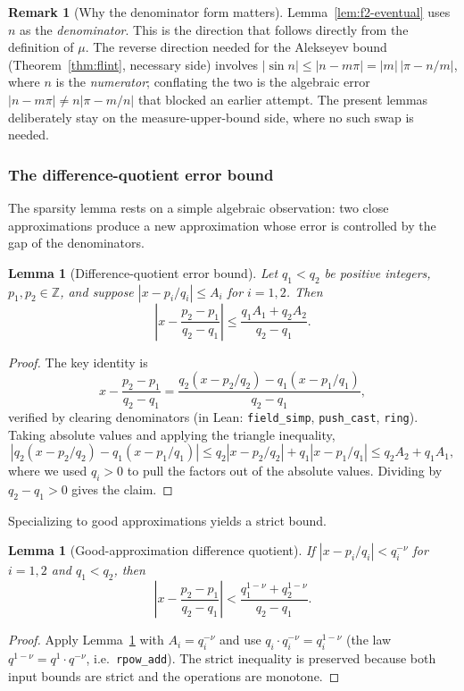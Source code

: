 \documentclass[11pt]{amsart}
\newtheorem{lemma}[theorem]{Lemma}
\theoremstyle{definition}
\newtheorem{remark}[theorem]{Remark}
\theoremstyle{remark}
\numberwithin{equation}{section}
\newcommand{\Z}{\mathbb{Z}}
\newcommand{\irr}{\mu}
\begin{document}
\begin{remark}[Why the denominator form matters]\label{rem:f2-denom}
Lemma~\ref{lem:f2-eventual} uses $n$ as the \emph{denominator}. This is the direction that follows directly from the definition of $\irr$. The reverse direction needed for the Alekseyev bound (Theorem~\ref{thm:flint}, necessary side) involves $|\sin n|\le|n-m\pi|=|m|\,|\pi-n/m|$, where $n$ is the \emph{numerator}; conflating the two is the algebraic error $|n-m\pi|\ne n|\pi-m/n|$ that blocked an earlier attempt. The present lemmas deliberately stay on the measure-upper-bound side, where no such swap is needed.
\end{remark}

\subsubsection{The difference-quotient error bound}

The sparsity lemma rests on a simple algebraic observation: two close approximations produce a new approximation whose error is controlled by the gap of the denominators.

\begin{lemma}[Difference-quotient error bound]\label{lem:f2-dq}
Let $q_1<q_2$ be positive integers, $p_1,p_2\in\Z$, and suppose $|x-p_i/q_i|\le A_i$ for $i=1,2$. Then
\[
\left|x-\frac{p_2-p_1}{q_2-q_1}\right|\le\frac{q_1 A_1+q_2 A_2}{q_2-q_1}.
\]
\end{lemma}
\begin{proof}
The key identity is
\[
x-\frac{p_2-p_1}{q_2-q_1}=\frac{q_2(x-p_2/q_2)-q_1(x-p_1/q_1)}{q_2-q_1},
\]
verified by clearing denominators (in Lean: \texttt{field\_simp}, \texttt{push\_cast}, \texttt{ring}). Taking absolute values and applying the triangle inequality,
\[
|q_2(x-p_2/q_2)-q_1(x-p_1/q_1)|\le q_2|x-p_2/q_2|+q_1|x-p_1/q_1|\le q_2 A_2+q_1 A_1,
\]
where we used $q_i>0$ to pull the factors out of the absolute values. Dividing by $q_2-q_1>0$ gives the claim.
\end{proof}

Specializing to good approximations yields a strict bound.

\begin{lemma}[Good-approximation difference quotient]\label{lem:f2-good-dq}
If $|x-p_i/q_i|<q_i^{-\nu}$ for $i=1,2$ and $q_1<q_2$, then
\[
\left|x-\frac{p_2-p_1}{q_2-q_1}\right|<\frac{q_1^{1-\nu}+q_2^{1-\nu}}{q_2-q_1}.
\]
\end{lemma}
\begin{proof}
Apply Lemma~\ref{lem:f2-dq} with $A_i=q_i^{-\nu}$ and use $q_i\cdot q_i^{-\nu}=q_i^{1-\nu}$ (the law $q^{1-\nu}=q^1\cdot q^{-\nu}$, i.e.\ \texttt{rpow\_add}). The strict inequality is preserved because both input bounds are strict and the operations are monotone.
\end{proof}
\end{document}
